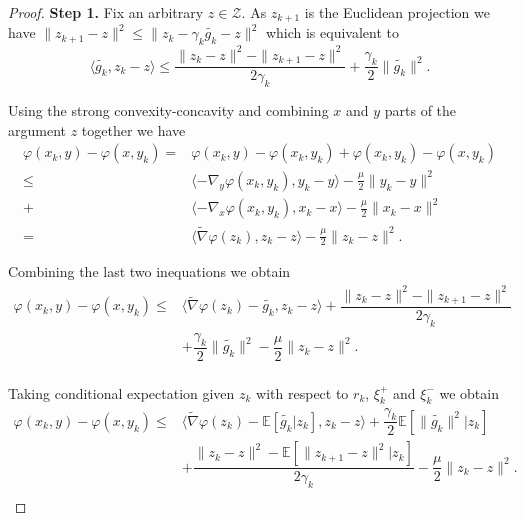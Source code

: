 \documentclass[runningheads]{llncs}
\newcommand{\E}{{\mathbb E}}
\def\E{\mathbb E}
\def\la{\langle}
\def\ra{\rangle}
\begin{document}
\begin{proof}
{\bf Step 1.}
Fix an arbitrary $z \in \mathcal{Z}$. As $z_{k+1}$ is the Euclidean projection we have $\|z_{k+1} - z\|^2 \leq \| z_k - \gamma_k \widetilde{g_k} - z \|^2 $ which is equivalent to 
\begin{equation}
    \langle \widetilde{g_k}, z_k-z \rangle \leq \dfrac{\| z_k - z \|^2 - \| z_{k+1} - z \|^2}{2\gamma_k} + \dfrac{\gamma_k}{2} \| \widetilde{g_k} \|^2.
\end{equation}

Using the strong convexity-concavity and combining $x$ and $y$ parts of the argument $z$ together  we have 
\begin{equation}
\begin{split}
    \varphi(x_k, y) - \varphi(x, y_k) 
    =& \varphi(x_k, y) - \varphi(x_k, y_k) + \varphi(x_k, y_k) - \varphi(x, y_k)  \\
    \leq & \la -\nabla_y \varphi(x_k,y_k), y_k-y\ra - \frac{\mu}{2} \|y_k-y \|^2 \\
    + & \la -\nabla_x \varphi(x_k,y_k), x_k-x\ra - \frac{\mu}{2} \|x_k-x \|^2 \\
    = & \la \widetilde{\nabla} \varphi(z_k), z_k-z\ra - \frac{\mu}{2} \|z_k-z \|^2.
\end{split}
\end{equation}

Combining the last two inequations we obtain
\begin{equation}
\begin{split}
\varphi(x_k, y) - \varphi(x, y_k) 
\leq & \langle \widetilde{\nabla} \varphi(z_k) - \widetilde{g_k}, z_k - z \rangle 
+ \dfrac{\| z_k - z \|^2 - \| z_{k+1} - z \|^2}{2\gamma_k} \\
 & + \dfrac{\gamma_k}{2} \| \widetilde{g_k} \|^2
    - \dfrac{\mu}{2} \| z_k - z \|^2. \\
\end{split}
\end{equation}

Taking conditional expectation given $z_k$ with respect to $r_{k}$, $\xi^+_{k}$ and $\xi^-_{k}$ we obtain 
\begin{equation}\label{regret_bound}
\begin{split}
\varphi(x_k, y) - \varphi(x, y_k) \leq & \langle \widetilde{\nabla} \varphi(z_k) -  \E \left[\widetilde{g_k} | z_k \right] , z_k - z \rangle  + \dfrac{\gamma_k}{2} \E \left[ \| \widetilde{g_k} \|^2 | z_k \right] \\
& +  \dfrac{\| z_k - z \|^2 - \E \left[\| z_{k+1} - z \|^2 | z_k \right]}{2\gamma_k} - \dfrac{\mu}{2} \| z_k - z \|^2. \\
\end{split}
\end{equation}


\end{proof}
\end{document}
